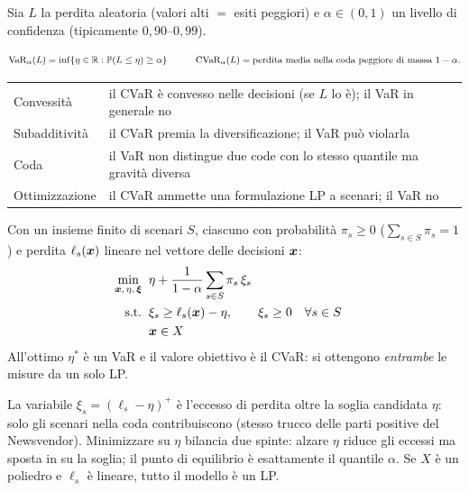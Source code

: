 Sia $L$ la perdita aleatoria (valori alti $=$ esiti peggiori) e $\alpha \in (0,1)$
un livello di confidenza (tipicamente $0{,}90$--$0{,}99$).

\begin{modello}
\[
\mathrm{VaR}_\alpha(L) = \inf\{\eta \in \mathbb{R} : \mathbb{P}(L \le \eta) \ge \alpha\}
\qquad\quad
\mathrm{CVaR}_\alpha(L) = \text{perdita media nella coda peggiore di massa } 1 - \alpha .
\]
\end{modello}

\begin{center}\small
\begin{tabular}{lp{10.2cm}}
\toprule
Convessità & il CVaR è convesso nelle decisioni (se $L$ lo è); il VaR in generale no \\
Subadditività & il CVaR premia la diversificazione; il VaR può violarla \\
Coda & il VaR non distingue due code con lo stesso quantile ma gravità diversa \\
Ottimizzazione & il CVaR ammette una formulazione LP a scenari; il VaR no \\
\bottomrule
\end{tabular}
\end{center}

\begin{modello}
Con un insieme finito di scenari $S$, ciascuno con probabilità $\pi_s \ge 0$
($\sum_{s \in S} \pi_s = 1$) e perdita $\ell_s(\boldsymbol{x})$ lineare nel vettore delle
decisioni $\boldsymbol{x}$:
\begin{align}
\min_{\boldsymbol{x},\,\eta,\,\boldsymbol{\xi}}\;\; & \eta + \frac{1}{1-\alpha} \sum_{s \in S} \pi_s\, \xi_s \notag\\
\text{s.t.}\;\; & \xi_s \ge \ell_s(\boldsymbol{x}) - \eta, \qquad \xi_s \ge 0 && \forall s \in S \notag\\
& \boldsymbol{x} \in X \notag
\end{align}
All'ottimo $\eta^*$ è un VaR e il valore obiettivo è il CVaR: si ottengono
\emph{entrambe} le misure da un solo LP.
\end{modello}

\begin{spiegazione}
La variabile $\xi_s = (\ell_s - \eta)^+$ è l'eccesso di perdita oltre la soglia
candidata $\eta$: solo gli scenari nella coda contribuiscono (stesso trucco delle
parti positive del Newsvendor). Minimizzare su $\eta$ bilancia due spinte: alzare
$\eta$ riduce gli eccessi ma sposta in su la soglia; il punto di equilibrio è
esattamente il quantile $\alpha$. Se $X$ è un poliedro e $\ell_s$ è lineare, tutto il
modello è un LP.
\end{spiegazione}

